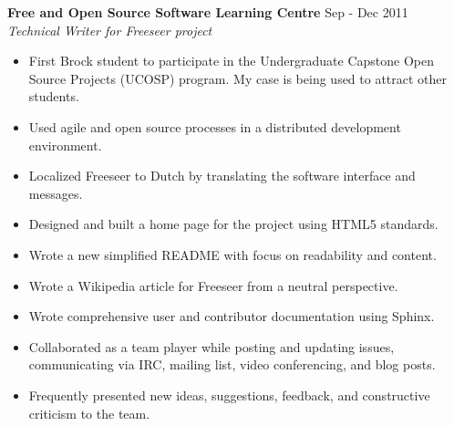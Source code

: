 \documentclass[margin]{res}
\begin{document}
\begin{resume}
	\textbf{Free and Open Source Software Learning Centre} \hfill Sep - Dec 2011 \\
    {\sl Technical Writer for Freeseer project} \hfill %
	\begin{itemize}  \itemsep -2pt %
	  \item First Brock student to participate in the Undergraduate Capstone Open Source Projects
	  (UCOSP) program. My case is being used to attract other students.
	  \item Used agile and open source processes in a distributed development environment.
	  \item Localized Freeseer to Dutch by translating the software interface and messages.
	  \item Designed and built a home page for the project using HTML5 standards.
    \item Wrote a new simplified README with focus on readability and content.
	  \item Wrote a Wikipedia article for Freeseer from a neutral perspective.
	  \item Wrote comprehensive user and contributor documentation using Sphinx.
	  \item Collaborated as a team player while posting and updating issues,
	  communicating via IRC, mailing list, video conferencing, and blog posts.
	  \item Frequently presented new ideas, suggestions, feedback, and constructive criticism to the team.
	\end{itemize}


\end{resume}
\end{document}
